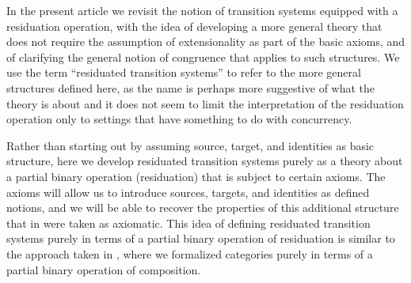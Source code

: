 \documentclass[11pt,notitlepage,a4paper]{report}
\begin{document}
In the present article we revisit the notion of transition systems equipped with a
residuation operation, with the idea of developing a more general theory that does not
require the assumption of extensionality as part of the basic axioms, and of clarifying
the general notion of congruence that applies to such structures.
We use the term ``residuated transition systems'' to refer to the more general structures
defined here, as the name is perhaps more suggestive of what the theory is about and
it does not seem to limit the interpretation of the residuation operation only to settings
that have something to do with concurrency.

Rather than starting out by assuming source, target, and identities as basic structure,
here we develop residuated transition systems purely as a theory about a partial binary
operation (residuation) that is subject to certain axioms.  The axioms will allow us to
introduce sources, targets, and identities as defined notions, and we will be able to
recover the properties of this additional structure that in \cite{cts} were taken as
axiomatic.  This idea of defining residuated transition systems purely in terms of
a partial binary operation of residuation is similar to the approach taken in
\cite{Category3-AFP}, where we formalized categories purely in terms of a partial binary
operation of composition.
\end{document}
